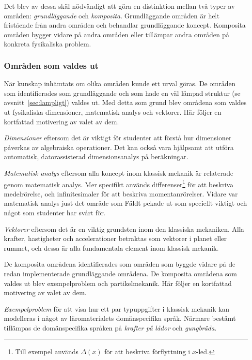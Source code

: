 Det blev av dessa skäl nödvändigt att göra en distinktion mellan två typer av
områden: \textit{grundläggande} och \textit{komposita}. Grundläggande områden är
helt fristående från andra områden och behandlar grundläggande koncept.
Komposita områden bygger vidare på andra områden eller tillämpar andra områden
på konkreta fysikaliska problem.

\subsubsection*{Områden som valdes ut}

När kunskap inhämtats om olika områden kunde ett urval göras. De områden som
identifierades som grundläggande och som hade en väl lämpad struktur (se
avsnitt~\ref{sec:lampligt}) valdes ut. Med detta som grund blev områdena som valdes ut fysikaliska dimensioner, matematisk analys och vektorer. Här följer en kortfattad motivering av valet av dem.

\textit{Dimensioner} eftersom det är viktigt för studenter att förstå
hur dimensioner påverkas av algebraiska operationer. Det kan också vara
hjälpsamt att utföra automatisk, datorassisterad dimensionsanalys på
beräkningar.

\textit{Matematisk analys} eftersom alla koncept inom klassisk mekanik är
relaterade genom matematisk analys. Mer specifikt används
differenser\footnote{Till exempel används $\Delta(x)$ för att beskriva
förflyttning i $x$-led.} för att beskriva medelrörelse, och infinitesimaler
för att beskriva momentanrörelser. Vidare var matematisk analys just det
område som Fäldt pekade ut som speciellt viktigt och något som studenter har
svårt för.

\textit{Vektorer} eftersom det är en viktig grundsten inom den klassiska
mekaniken. Alla krafter, hastigheter och accelerationer betraktas som vektorer i
planet eller rummet, och dessa är alla fundamentala element inom klassisk
mekanik.

De komposita områdena identifierades som områden som byggde vidare på de redan
implementerade grundläggande områdena. De komposita områdena som valdes ut
blev exempelproblem och partikelmekanik. Här följer en kortfattad motivering av valet av dem.

\textit{Exempelproblem} för att visa hur ett par typuppgifter i klassisk mekanik kan modelleras i något av läromaterialets domänspecifika språk. Närmare bestämt tillämpas de domänspecifika språken på \textit{krafter på lådor} och \textit{gungbräda}.

